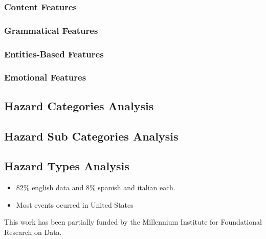 \documentclass[sigconf]{acmart}
\begin{document}
\subsubsection{Content Features}

\subsubsection{Grammatical Features}

\subsubsection{Entities-Based Features}

\subsubsection{Emotional Features}

\subsection{Hazard Categories Analysis}

\subsection{Hazard Sub Categories Analysis}

\subsection{Hazard Types Analysis}

\begin{itemize}
	\item $82\%$ english data and $8\%$ spanish and italian each.
	\item Most events ocurred in United States
\end{itemize}




\begin{acks}
This work has been partially funded by the Millennium Institute for Foundational Research on Data.	
\end{acks}



\balance
 
\end{document}
